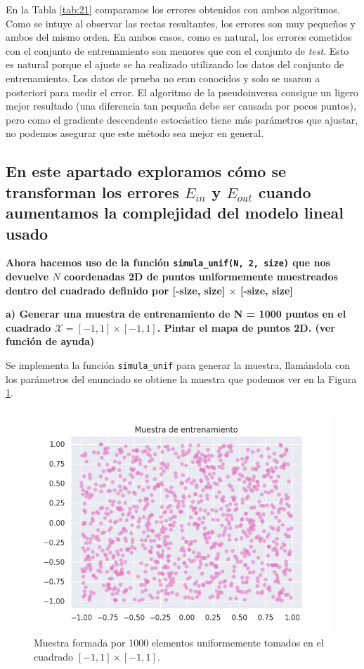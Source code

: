 \documentclass[a4paper, 20pt]{article}
\begin{document}
En la Tabla \ref{tab:21} comparamos los errores obtenidos con ambos algoritmos. Como se intuye al observar las rectas resultantes, los errores son muy pequeños y ambos del mismo orden. En ambos casos, como es natural, los errores cometidos con el conjunto de entrenamiento son menores que con el conjunto de \textit{test}. Esto es natural porque el ajuste se ha realizado utilizando los datos del conjunto de entrenamiento. Los datos de prueba no eran conocidos y solo se usaron a posteriori para medir el error. El algoritmo de la pseudoinversa consigue un ligero mejor resultado (una diferencia tan pequeña debe ser causada por pocos puntos), pero como el gradiente descendente estocástico tiene más parámetros que ajustar, no podemos asegurar que este método sea mejor en general.

\subsection{En este apartado exploramos cómo se transforman los errores $E_{in}$ y $E_{out}$ cuando aumentamos la complejidad del modelo lineal usado}
\textbf{Ahora hacemos uso de la función \texttt{simula\_unif(N, 2, size)} que nos devuelve $N$ coordenadas 2D de puntos uniformemente muestreados dentro del cuadrado definido por [-size, size] $\times$ [-size, size]}

\textbf{a) Generar una muestra de entrenamiento de N = 1000 puntos en el cuadrado $\mathcal{X} = [-1, 1] \times [-1, 1]$. Pintar el mapa de puntos 2D. (ver función de ayuda)}

Se implementa la función \texttt{simula\_unif} para generar la muestra, llamándola con los parámetros del enunciado se obtiene la muestra que podemos ver en la Figura \ref{fig:22a}.

\begin{figure}[H]
    \centering
    \includegraphics[width=1\textwidth]{muestra2d}
    \caption{Muestra formada por 1000 elementos uniformemente tomados en el cuadrado $[-1,1]\times[-1,1]$.}
    \label{fig:22a}
\end{figure}
\end{document}
